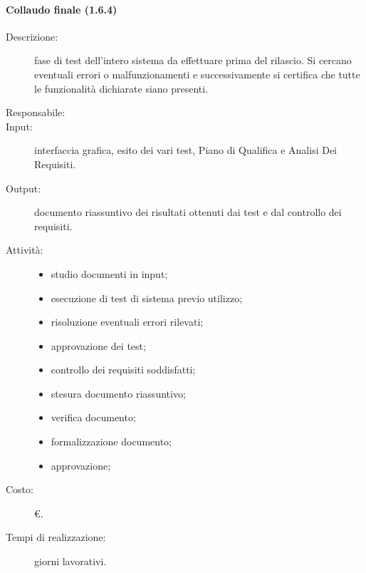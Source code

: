 \paragraph{Collaudo finale (1.6.4)}
\begin{description}
\item[Descrizione:] fase di test dell'intero sistema da effettuare prima del rilascio. Si cercano eventuali errori o malfunzionamenti e successivamente si certifica che tutte le funzionalità dichiarate siano presenti.
\item[Responsabile:] 
\item[Input:] interfaccia grafica, esito dei vari test, Piano di Qualifica e Analisi Dei Requisiti.
\item[Output:] documento riassuntivo dei risultati ottenuti dai test e dal controllo dei requisiti.
\item[Attività:]
\begin{itemize}
\item studio documenti in input;
\item esecuzione di test di sistema previo utilizzo;
\item risoluzione eventuali errori rilevati;
\item approvazione dei test;
\item controllo dei requisiti soddisfatti;
\item stesura documento riassuntivo;
\item verifica documento;
\item formalizzazione documento;
\item approvazione;
\end{itemize}
\item[Costo:] \euro{}.
\item[Tempi di realizzazione:]  giorni lavorativi.
\end{description}

